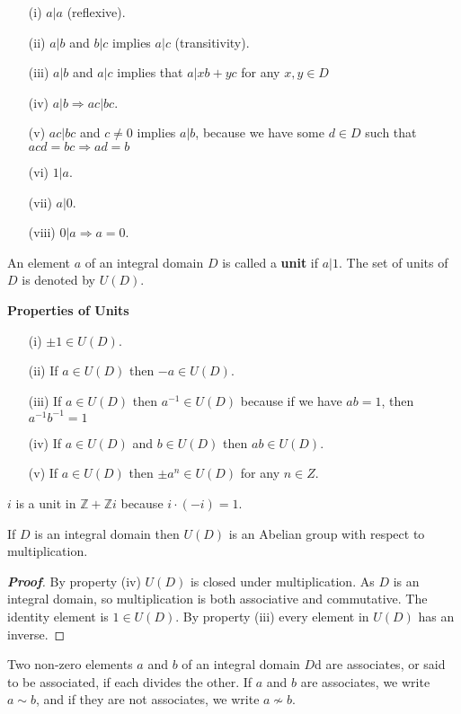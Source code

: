 \begin{enumerate}
\item[(i)] $a|a$ (reflexive).
\item[(ii)] $a|b$ and $b|c$ implies $a|c$ (transitivity).
\item[(iii)] $a|b$ and $a|c$ implies that $a|xb+yc$ for any $x,y \in D$
\item[(iv)] $a|b \Rightarrow ac|bc$.
\item[(v)] $ac|bc$ and $c \neq 0$ implies $a|b$, because we have some $d \in D$ such that $acd=bc \Rightarrow ad=b$
\item[(vi)] $1|a$.
\item[(vii)] $a|0$.
\item[(viii)] $0|a \Rightarrow a=0$.
\end{enumerate}
\begin{definition} An element $a$ of an integral domain $D$ is called a {\bf unit} if $a|1$. The set of units of $D$ is denoted by $U(D)$.
\end{definition}
\begin{center} {\bf Properties of Units}
\end{center}
\begin{enumerate}
\item[(i)] $\pm 1 \in U(D)$.
\item[(ii)] If $a \in U(D)$ then $-a \in U(D)$.
\item[(iii)] If $a \in U(D)$ then $a^{-1} \in U(D)$ because if we have $ab=1$, then $a^{-1}b^{-1}=1$
\item[(iv)] If $a \in U(D)$ and $b \in U(D)$ then $ab \in U(D)$.
\item[(v)] If $a \in U(D)$ then $\pm a^n \in U(D)$ for any $n \in Z$.
\end{enumerate}
\begin{example} $i$ is a unit in $\mathbb{Z}+\mathbb{Z}i$ because $i \cdot (-i)=1$.
\end{example}
\begin{theorem} If $D$ is an integral domain then $U(D)$ is an Abelian group with respect to multiplication.
\end{theorem}
\begin{proof}[\bf Proof] By property (iv) $U(D)$ is closed under multiplication. As $D$ is an integral domain, so multiplication is both associative and commutative. The identity element is $1 \in U(D)$. By property (iii) every element in $U(D)$ has an inverse.
\end{proof}
\begin{definition} Two non-zero elements $a$ and $b$ of an integral domain $D$d are associates, or said to be associated, if each divides the other. If $a$ and $b$ are associates, we write $a \sim b$, and if they are not associates, we write $a \not \sim b$.
\end{definition}
